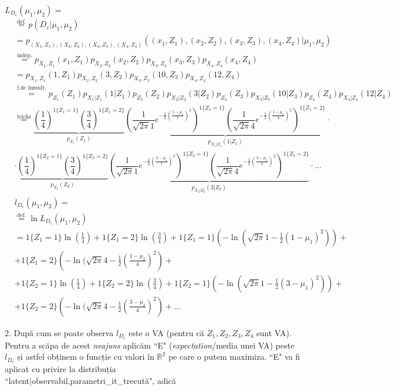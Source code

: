 \documentclass[12pt]{article}
\begin{document}
\begin{enumerate}
		$L_{D_c}(\mu_1,\mu_2) =$
		\begin{align*}
		&\stackrel{\text{def.}}{=} p(D_c|\mu_1,\mu_2)\\
		&=p_{(X_1,Z_1),(X_2,Z_2),(X_3,Z_3),(X_4,Z_4)}((x_1,Z_1),(x_2,Z_2),(x_3,Z_3),(x_4,Z_4)|\mu_1,\mu_2)\\
		&\stackrel{\text{indep.}}{=}p_{X_1,Z_1}(x_1,Z_1) p_{X_2,Z_2}(x_2,Z_2) p_{X_3,Z_3}(x_3,Z_3) p_{X_4,Z_4}(x_4,Z_4)\\
		&=p_{X_1,Z_1}(1,Z_1) p_{X_2,Z_2}(3,Z_2) p_{X_3,Z_3}(10,Z_3) p_{X_4,Z_4}(12,Z_4)\\
		&\stackrel{\text{f.de înmulț.}}{=}p_{Z_1}(Z_1) p_{X_1|Z_1}(1|Z_1) p_{Z_2}(Z_2) p_{X_2|Z_2}(3|Z_2) p_{Z_3}(Z_3) p_{X_3|Z_3}(10|Z_3) p_{Z_4}(Z_4) p_{X_4|Z_4}(12|Z_4)\\
		&\stackrel{\text{tricks}}{=}
		\underbrace{\left(\dfrac{1}{4}\right)^{1\{Z_1=1\}} \left(\dfrac{3}{4}\right)^{1\{Z_1=2\}}}_{p_{Z_1}(Z_1)} \underbrace{\left(\dfrac{1}{\sqrt{2\pi} 1} e^{-\frac{1}{2} \left(\frac{1-\mu_1}{1}\right)^2}\right)^{1\{Z_1=1\}} \left(\dfrac{1}{\sqrt{2\pi} 4} e^{-\frac{1}{2} \left(\frac{1-\mu_2}{4}\right)^2}\right)^{1\{Z_1=2\}}}_{p_{X_1|Z_1}(1|Z_1)} \cdot\\
		&\cdot \underbrace{\left(\dfrac{1}{4}\right)^{1\{Z_2=1\}} \left(\dfrac{3}{4}\right)^{1\{Z_2=2\}}}_{p_{Z_2}(Z_2)} \underbrace{\left(\dfrac{1}{\sqrt{2\pi} 1} e^{-\frac{1}{2} \left(\frac{3-\mu_1}{1}\right)^2}\right)^{1\{Z_2=1\}} \left(\dfrac{1}{\sqrt{2\pi} 4} e^{-\frac{1}{2} \left(\frac{3-\mu_2}{4}\right)^2}\right)^{1\{Z_2=2\}}}_{p_{X_2|Z_2}(3|Z_2)} \cdot \dots\\
		&l_{D_c}(\mu_1,\mu_2) =\\
		&\stackrel{\text{def.}}{=} \ln L_{D_c} (\mu_1,\mu_2)\\
		&=1\{Z_1 = 1\} \ln\left(\frac{1}{4}\right) + 1\{Z_1 = 2\} \ln\left(\frac{3}{4}\right) + 1\{Z_1 = 1\} \left(-\ln(\sqrt{2\pi }1 - \frac{1}{2} (1 - \mu_1)^2)\right) + \\
		&+1\{Z_1 = 2\} \left(-\ln(\sqrt{2\pi}4 - \frac{1}{2} \left(\frac{1 - \mu_2}{4}\right)^2\right) +\\
		&+1\{Z_2 = 1\} \ln\left(\frac{1}{4}\right) + 1\{Z_2 = 2\} \ln\left(\frac{3}{4}\right) + 1\{Z_2 = 1\} \left(-\ln(\sqrt{2\pi }1 - \frac{1}{2} (3 - \mu_1)^2)\right) + \\
		&+1\{Z_2 = 2\} \left(-\ln(\sqrt{2\pi }4 - \frac{1}{2} \left(\frac{3 - \mu_2}{4}\right)^2\right) + \dots
		\end{align*}
		
		2. După cum se poate observa $l_{D_c}$ este o VA (pentru că $Z_1, Z_2, Z_3, Z_4$ sunt VA). Pentru a scăpa de acest \textit{neajuns} aplicăm ``E" (\textit{expectation}/media unei VA) peste $l_{D_c}$ și astfel obținem o funcție cu valori în $\mathbb{R}^2$ pe care o putem maximiza. ``E" va fi aplicat cu privire la distribuția\\ ``latent$|$observabil,parametri\_it\_trecută", adică 
		

\end{enumerate}
\end{document}
